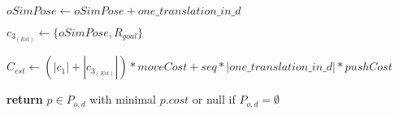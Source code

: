 \begin{algorithm}[H]
\begin{algorithmic}[1]
          \State $oSimPose \gets oSimPose + one\_translation\_in\_d$

          \State $c_{3_{(Est)}} \gets \{oSimPose, R_{goal}\}$

          \State $C_{est} \gets (|c_{1}| + |c_{3_{(Est)}}|) * moveCost + seq * |one\_translation\_in\_d| * pushCost$

        \EndWhile

      \EndFor

    \State \textbf{return} $p \in P_{o,d}$ with minimal $p.cost$ or null if $P_{o,d} = \emptyset$

    \EndProcedure

  \end{algorithmic}
\end{algorithm}
